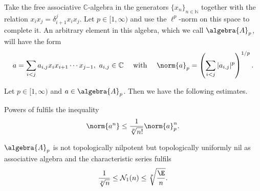 \documentclass[
11pt,                          %
english                        %
]{article}
\begin{document}
Take the free associative $\mathbb{C}$-algebra in the generators $\{x_n\}_{n \in 
\mathbb{N}}$ together with the relation $x_i x_j = \delta_{i+1}^j x_i x_j$. Let 
$p \in [1, \infty)$ and use the $\ell^p$-norm on this space to complete it. An 
arbitrary element in this algebra, which we call $\algebra{A}_p$, will have the form
\begin{equation*}
	a =
	\sum\limits_{i < j}
	a_{i, j} x_i x_{i + 1} \cdots x_{j - 1}
	, \
	a_{i,j} \in \mathbb{C}
	\quad \text{ with } \quad
	\norm{a}_p
	=
	\left(
		\sum\limits_{i < j}
		|a_{i, j}|^p
	\right)^{1/p}.
\end{equation*}
\begin{lemma}
	\label{lemma:Ex1}
	Let $p \in [1, \infty)$ and $a \in \algebra{A}_p$. 
	Then we have the following estimates.
	\begin{lemmalist}
		\item
		Powers of  fulfils the inequality
		\begin{equation}
			\label{eq:lemma:Ex1Powers}
			\norm{a^n}
			\leq
			\frac{1}{\sqrt[p]{n!}}
			\norm{a}_p^n.
		\end{equation}
		
		\item
		$\algebra{A}_p$ is not topologically nilpotent but topologically uniformly 
		nil as associative algebra and the characteristic series fulfils
		\begin{equation}
			\label{eq:lemma:Ex1Sequence}
			\frac{1}{\sqrt[p]{n}}
			\leq 
			\mathcal{N}_1(n) 
			\leq 
			\sqrt[p]{\frac{\E}{n}}.
		\end{equation}	
	\end{lemmalist}
\end{lemma}
\end{document}
